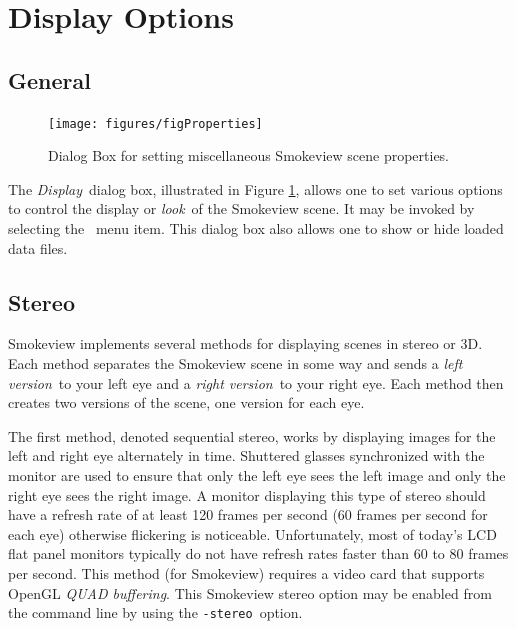 \documentclass[11pt,twoside]{book}
\newcommand{\figoptions}{hbp}
\begin{document}
\section{Display Options}
\subsection{General}
\begin{figure}[\figoptions]
\centerline{\texttt{[image: figures/figProperties]}
} \caption [Dialog Box for setting miscellaneous Smokeview scene
properties.] {Dialog Box for setting miscellaneous Smokeview scene
properties.} \label{figProperties}
\end{figure}
The {\em Display}\ dialog box, illustrated in Figure \ref{figProperties},
allows one to set various options to control the display or
{\em look}\ of the Smokeview scene.  It may be invoked by selecting
the \ menu item.  This dialog box also
allows one to show or hide loaded data files.


\subsection{Stereo}
Smokeview implements several methods for displaying scenes in stereo or 3D.  Each method separates the
Smokeview scene in some way and sends a {\em left version}\ to your left eye and a {\em right version}\
to your right eye.
Each method then creates two versions of the scene, one version for each eye.

The first method, denoted sequential stereo, works by displaying images for the left and right eye
alternately in time.  Shuttered glasses  synchronized
with the monitor are used to ensure that only the left eye sees the left image and only the right eye sees the right image.  A monitor displaying this type of stereo should have a refresh rate of at least 120 frames per second (60 frames per second for each eye) otherwise
flickering is noticeable.  Unfortunately, most of today's LCD flat panel monitors typically do not have refresh rates faster than 60 to 80 frames per second.  This method (for Smokeview) requires a video card that supports OpenGL {\em QUAD buffering}.
This Smokeview stereo option may be enabled from the command line by using the {\tt -stereo}\
option.
\end{document}
